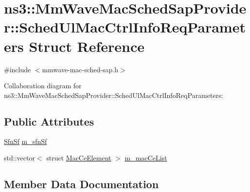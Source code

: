 \hypertarget{structns3_1_1MmWaveMacSchedSapProvider_1_1SchedUlMacCtrlInfoReqParameters}{}\section{ns3\+:\+:Mm\+Wave\+Mac\+Sched\+Sap\+Provider\+:\+:Sched\+Ul\+Mac\+Ctrl\+Info\+Req\+Parameters Struct Reference}
\label{structns3_1_1MmWaveMacSchedSapProvider_1_1SchedUlMacCtrlInfoReqParameters}


{\ttfamily \#include $<$mmwave-\/mac-\/sched-\/sap.\+h$>$}



Collaboration diagram for ns3\+:\+:Mm\+Wave\+Mac\+Sched\+Sap\+Provider\+:\+:Sched\+Ul\+Mac\+Ctrl\+Info\+Req\+Parameters\+:
\subsection*{Public Attributes}
\begin{DoxyCompactItemize}
\item 
\hyperlink{structns3_1_1SfnSf}{Sfn\+Sf} \hyperlink{structns3_1_1MmWaveMacSchedSapProvider_1_1SchedUlMacCtrlInfoReqParameters_aebf3380508f5e62060f8aeffe4008b64}{m\+\_\+sfn\+Sf}
\item 
std\+::vector$<$ struct \hyperlink{structns3_1_1MacCeElement}{Mac\+Ce\+Element} $>$ \hyperlink{structns3_1_1MmWaveMacSchedSapProvider_1_1SchedUlMacCtrlInfoReqParameters_a75963eebf090412b5948a4c71d618f70}{m\+\_\+mac\+Ce\+List}
\end{DoxyCompactItemize}


\subsection{Member Data Documentation}
